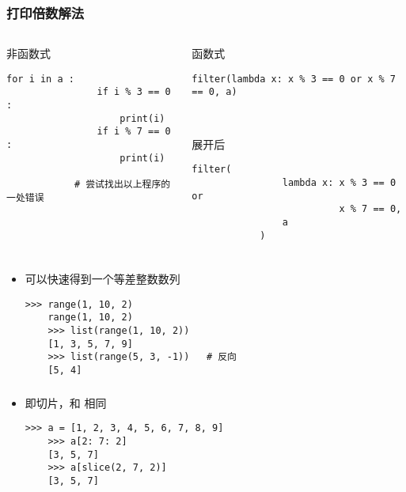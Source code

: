 \begin{frame} [fragile]
	\frametitle{打印倍数解法}
	\begin{columns}
		\begin{column}[T]{.42\textwidth}
			非函数式
			\begin{lstlisting}[style=pythonstyle, gobble=12, texcl]
			for i in a :
				if i % 3 == 0 :
					print(i)
				if i % 7 == 0 :
					print(i)

			# 尝试找出以上程序的一处错误
			\end{lstlisting}
		\end{column}
		\begin{column}[T]{.58\textwidth}
			函数式
			\begin{lstlisting}[style=pythonstyle, gobble=12, texcl]
			filter(lambda x: x % 3 == 0 or x % 7 == 0, a)
			\end{lstlisting}

			\

			展开后
			\begin{lstlisting}[style=pythonstyle, gobble=12, texcl]
			filter(
				lambda x: x % 3 == 0 or
						  x % 7 == 0,
				a
			)
			\end{lstlisting}
		\end{column}
	\end{columns}
\end{frame}

\begin{frame} [fragile]
	\frametitle{}
	\linespread{1.25}
	\begin{itemize}
	\item {}可以快速得到一个等差整数数列
	\begin{lstlisting}[style=pythonstyle, gobble=4, texcl]
	>>> range(1, 10, 2)
	range(1, 10, 2)
	>>> list(range(1, 10, 2))
	[1, 3, 5, 7, 9]
	>>> list(range(5, 3, -1))	# 反向
	[5, 4]
	\end{lstlisting}
	\end{itemize}
\end{frame}

\begin{frame} [fragile]
	\frametitle{}
	\linespread{1.25}
	\begin{itemize}
	\item {}即切片，和 \inlinePython{[a:b:c]} 相同
	\begin{lstlisting}[style=pythonstyle, gobble=4, texcl]
	>>> a = [1, 2, 3, 4, 5, 6, 7, 8, 9]
	>>> a[2: 7: 2]
	[3, 5, 7]
	>>> a[slice(2, 7, 2)]
	[3, 5, 7]
	\end{lstlisting}
	\end{itemize}
\end{frame}

